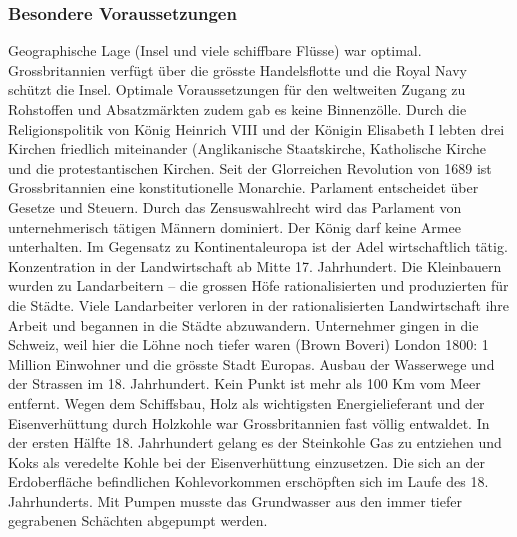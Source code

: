\documentclass[10pt, openright=true]{scrartcl}
\begin{document}
\subsubsection{Besondere Voraussetzungen}
Geographische Lage (Insel und viele schiffbare Flüsse) war optimal. Grossbritannien verfügt über die grösste Handelsflotte und die Royal Navy schützt die Insel. Optimale Voraussetzungen für den weltweiten Zugang zu Rohstoffen und Absatzmärkten zudem gab es keine Binnenzölle. Durch die Religionspolitik von König Heinrich VIII und der Königin Elisabeth I lebten drei Kirchen friedlich miteinander (Anglikanische Staatskirche, Katholische Kirche und die protestantischen Kirchen. Seit der Glorreichen Revolution von 1689 ist Grossbritannien eine konstitutionelle Monarchie. Parlament entscheidet über Gesetze und Steuern. Durch das Zensuswahlrecht wird das Parlament von unternehmerisch tätigen Männern dominiert. Der König darf keine Armee unterhalten. Im Gegensatz zu Kontinentaleuropa ist der Adel wirtschaftlich tätig. Konzentration in der Landwirtschaft ab Mitte 17. Jahrhundert. Die Kleinbauern wurden zu Landarbeitern – die grossen Höfe rationalisierten und produzierten für die Städte. Viele Landarbeiter verloren in der rationalisierten Landwirtschaft ihre Arbeit und begannen in die Städte abzuwandern. Unternehmer gingen in die Schweiz, weil hier die Löhne noch tiefer waren (Brown Boveri) London 1800: 1 Million Einwohner und die grösste Stadt Europas. Ausbau der Wasserwege und der Strassen im 18. Jahrhundert. Kein Punkt ist mehr als 100 Km vom Meer entfernt. Wegen dem Schiffsbau, Holz als wichtigsten Energielieferant und der Eisenverhüttung durch Holzkohle war Grossbritannien fast völlig entwaldet. In der ersten Hälfte 18. Jahrhundert gelang es der Steinkohle Gas zu entziehen und Koks als veredelte Kohle bei der Eisenverhüttung einzusetzen. Die sich an der Erdoberfläche befindlichen Kohlevorkommen erschöpften sich im Laufe des 18. Jahrhunderts. Mit Pumpen musste das Grundwasser aus den immer tiefer gegrabenen Schächten abgepumpt werden.
\end{document}
